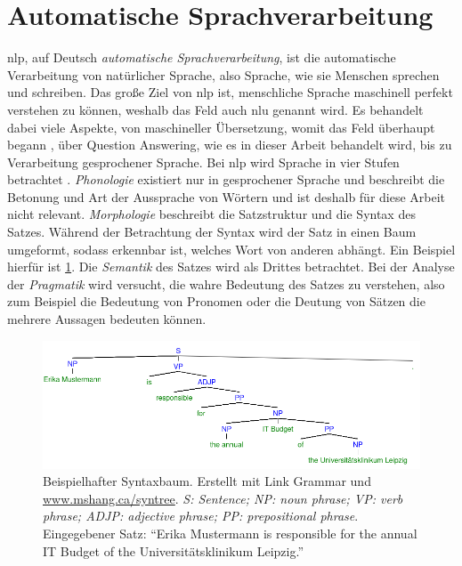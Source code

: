 \section{Automatische Sprachverarbeitung}

\acf{nlp}, auf Deutsch \emph{automatische Sprachverarbeitung}, ist die automatische Verarbeitung von natürlicher Sprache, also Sprache, wie sie Menschen sprechen und schreiben.
Das große Ziel von \ac{nlp} ist, menschliche Sprache maschinell perfekt verstehen zu können, weshalb das Feld auch \ac{nlu} genannt wird.
Es behandelt dabei viele Aspekte, von maschineller Übersetzung, womit das Feld überhaupt begann \citep{nlphistory}, über Question Answering,
wie es in dieser Arbeit behandelt wird, bis zu Verarbeitung gesprochener Sprache.
Bei \ac{nlp} wird Sprache in vier Stufen betrachtet \citep{nlpreviewtts}.
\emph{Phonologie} existiert nur in gesprochener Sprache und beschreibt die Betonung und Art der Aussprache von Wörtern und ist deshalb für diese Arbeit nicht relevant.
\emph{Morphologie} beschreibt die Satzstruktur und die Syntax des Satzes.
Während der Betrachtung der Syntax wird der Satz in einen Baum umgeformt, sodass erkennbar ist, welches Wort von anderen abhängt.
Ein Beispiel hierfür ist \cref{fig:syntaxtree}.
Die \emph{Semantik} des Satzes wird als Drittes betrachtet.
Bei der Analyse der \emph{Pragmatik} wird versucht, die wahre Bedeutung des Satzes zu verstehen, also zum Beispiel die Bedeutung von Pronomen oder die Deutung von Sätzen die mehrere Aussagen bedeuten können.
\begin{figure}%
\centering
\includegraphics[width=\textwidth, height=\textheight, keepaspectratio]{Images/syntaxtree.png}
\caption[Beispielhafter Syntaxbaum]{Beispielhafter Syntaxbaum. Erstellt mit Link Grammar \citep{grammarparser} und \url{www.mshang.ca/syntree}.
\emph{S: Sentence; NP: noun phrase; VP: verb phrase; ADJP: adjective phrase; PP: prepositional phrase}.
Eingegebener Satz: \enquote{Erika Mustermann is responsible for the annual IT Budget of the Universitätsklinikum Leipzig.}}
\label{fig:syntaxtree}
\end{figure}

